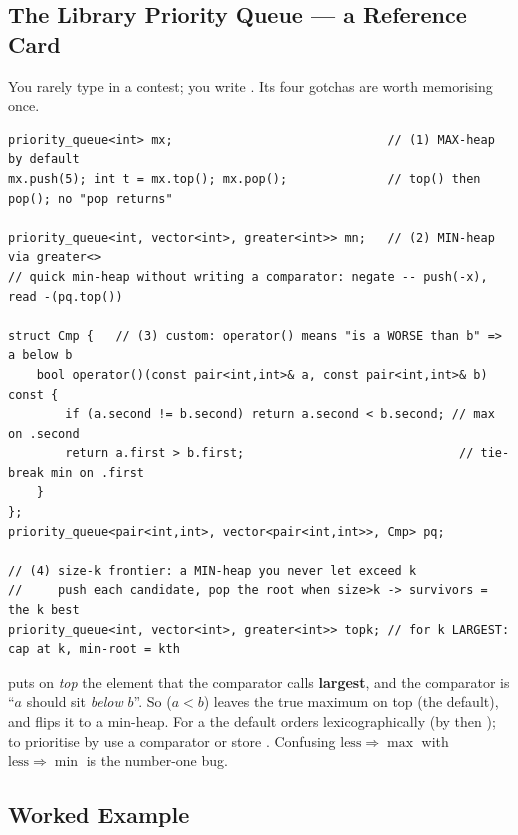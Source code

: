 \subsection{The Library Priority Queue --- a Reference Card}

You rarely type  in a contest; you write . Its four gotchas are
worth memorising once.

\begin{lstlisting}[caption={\code{std::priority\_queue} idioms: default max, \code{greater} for min, custom comparator, the size-k frontier}, label={lst:c07-pq}]
priority_queue<int> mx;                              // (1) MAX-heap by default
mx.push(5); int t = mx.top(); mx.pop();              // top() then pop(); no "pop returns"

priority_queue<int, vector<int>, greater<int>> mn;   // (2) MIN-heap via greater<>
// quick min-heap without writing a comparator: negate -- push(-x), read -(pq.top())

struct Cmp {   // (3) custom: operator() means "is a WORSE than b" => a below b
    bool operator()(const pair<int,int>& a, const pair<int,int>& b) const {
        if (a.second != b.second) return a.second < b.second; // max on .second
        return a.first > b.first;                              // tie-break min on .first
    }
};
priority_queue<pair<int,int>, vector<pair<int,int>>, Cmp> pq;

// (4) size-k frontier: a MIN-heap you never let exceed k
//     push each candidate, pop the root when size>k -> survivors = the k best
priority_queue<int, vector<int>, greater<int>> topk; // for k LARGEST: cap at k, min-root = kth
\end{lstlisting}

\begin{notebox}
 puts on \emph{top} the element that the comparator calls \textbf{largest}, and the
comparator  is ``$a$ should sit \emph{below} $b$''. So  ($a<b$) leaves the true
maximum on top (the default), and  flips it to a min-heap. For a  the default
orders lexicographically (by  then ); to prioritise by  use a
comparator or store . Confusing $\text{less}\Rightarrow\max$ with $\text{less}%
\Rightarrow\min$ is the number-one  bug.
\end{notebox}

\subsection{Worked Example}

